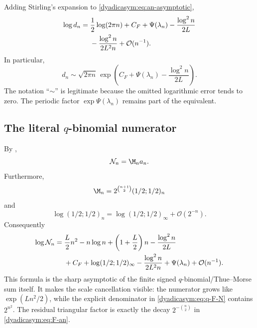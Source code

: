 \documentclass[11pt,oneside]{article}
\theoremstyle{definition}
\theoremstyle{remark}
\newcommand{\bigO}{\mathcal O}
\begin{document}
Adding Stirling's expansion to \eqref{dyadicasym:eq:an-asymptotic},
\begin{align}
 \log d_n={}&\frac12\log(2\pi n)+C_F+\Psi(\lambda_n)
 -\frac{\log^2n}{2L}                                      \notag\\
 &-\frac{\log^2n}{2L^2n}+\bigO(n^{-1}).                   \label{dyadicasym:eq:dn-asymptotic}
\end{align}
In particular,
\begin{equation}
 d_n\sim\sqrt{2\pi n}\,
 \exp\!\left(C_F+\Psi(\lambda_n)-\frac{\log^2n}{2L}\right).
                                                                    \label{dyadicasym:eq:dn-equivalent}
\end{equation}
The notation ``$\sim$'' is legitimate because the omitted logarithmic error tends to zero.
The periodic factor $\exp\Psi(\lambda_n)$ remains part of the equivalent.

\subsection{The literal \texorpdfstring{$q$}{q}-binomial numerator}

By ,
\begin{equation}
 \mathcal N_n=\M_na_n.                                      \label{dyadicasym:eq:N-product}
\end{equation}
Furthermore,
\begin{equation}
 \M_n=2^{\binom{n+1}{2}}(1/2;1/2)_n                       \label{dyadicasym:eq:M-q}
\end{equation}
and
\begin{equation}
 \log(1/2;1/2)_n=
 \log(1/2;1/2)_\infty+\bigO(2^{-n}).                       \label{dyadicasym:eq:qpoch-limit}
\end{equation}
Consequently
\begin{align}
 \log\mathcal N_n={}&\frac L2n^2-n\log n+
 \left(1+\frac L2\right)n-\frac{\log^2n}{2L}              \notag\\
 &+C_F+\log(1/2;1/2)_\infty
 -\frac{\log^2n}{2L^2n}+\Psi(\lambda_n)
 +\bigO(n^{-1}).                                            \label{dyadicasym:eq:N-asymptotic}
\end{align}
This formula is the sharp asymptotic of the finite signed $q$-binomial/Thue--Morse sum itself.
It makes the scale cancellation visible: the numerator grows like
$\exp(Ln^2/2)$, while the explicit denominator in \eqref{dyadicasym:eq:q-F-N} contains
$2^{n^2}$.  The residual triangular factor is exactly the decay
$2^{-\binom n2}$ in \eqref{dyadicasym:eq:F-an}.
\end{document}
